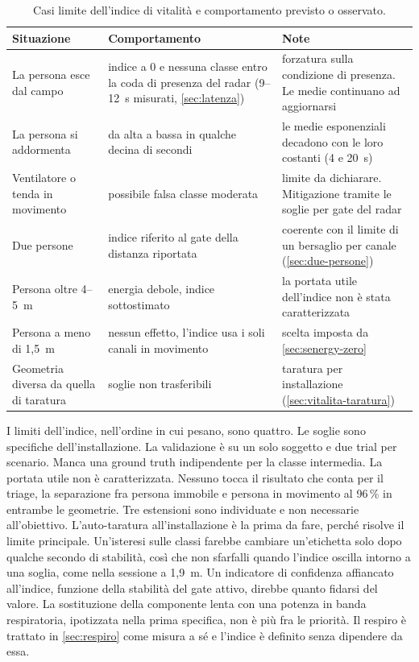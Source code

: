 \begin{table}[htbp]
\forcerectofloat
\centering
\caption{Casi limite dell'indice di vitalità e comportamento previsto o osservato.}
\label{tab:vitalita-casilimite}
\small
\begin{tabularx}{\linewidth}{@{}XXX@{}}
\toprule
\textbf{Situazione} & \textbf{Comportamento} & \textbf{Note} \\
\midrule
La persona esce dal campo & indice a 0 e nessuna classe entro la coda di presenza
  del radar (9--12~s misurati, \cref{sec:latenza}) & forzatura sulla condizione di
  presenza. Le medie continuano ad aggiornarsi \\
La persona si addormenta & da alta a bassa in qualche decina di secondi & le medie
  esponenziali decadono con le loro costanti (4 e 20~s) \\
Ventilatore o tenda in movimento & possibile falsa classe moderata & limite da
  dichiarare. Mitigazione tramite le soglie per gate del radar \\
Due persone & indice riferito al gate della distanza riportata & coerente con il
  limite di un bersaglio per canale (\cref{sec:due-persone}) \\
Persona oltre 4--5~m & energia debole, indice sottostimato & la portata utile
  dell'indice non è stata caratterizzata \\
Persona a meno di 1,5~m & nessun effetto, l'indice usa i soli canali in movimento &
  scelta imposta da \cref{sec:senergy-zero} \\
Geometria diversa da quella di taratura & soglie non trasferibili & taratura per
  installazione (\cref{sec:vitalita-taratura}) \\
\bottomrule
\end{tabularx}
\end{table}

I limiti dell'indice, nell'ordine in cui pesano, sono quattro. Le soglie sono
specifiche dell'installazione. La validazione è su un solo soggetto e due trial per
scenario. Manca una ground truth indipendente per la classe intermedia. La portata
utile non è caratterizzata. Nessuno tocca il risultato che conta per il triage, la
separazione fra persona immobile e persona in movimento al 96\,\% in entrambe le
geometrie. Tre estensioni sono individuate e non necessarie all'obiettivo.
L'auto-taratura all'installazione è la prima da fare, perché risolve il limite
principale. Un'isteresi sulle classi farebbe cambiare un'etichetta solo dopo qualche
secondo di stabilità, così che non sfarfalli quando l'indice oscilla intorno a una
soglia, come nella sessione a 1,9~m. Un indicatore di confidenza affiancato
all'indice, funzione della stabilità del gate attivo, direbbe quanto fidarsi del
valore. La sostituzione della componente lenta con una potenza in banda respiratoria,
ipotizzata nella prima specifica, non è più fra le priorità. Il respiro è trattato in
\cref{sec:respiro} come misura a sé e l'indice è definito senza dipendere da essa.
